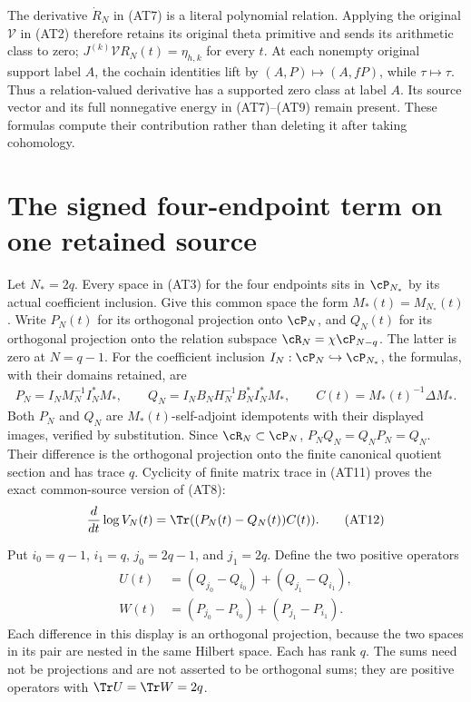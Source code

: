 \documentclass[10pt,a4paper,oneside]{report}
\begin{document}
The derivative $\dot R_N$ in (AT7) is a literal polynomial relation.
Applying the original $\mathcal V$ in (AT2) therefore retains its
original theta primitive and sends its arithmetic class to zero;
$J^{(k)}\mathcal V R_N(t)=\eta_{h,k}$ for every $t$.
At each nonempty original support label $A$, the cochain identities
lift by $(A,P)\mapsto(A,fP)$, while $\tau\mapsto\tau$.
Thus a relation-valued derivative has a supported zero class at
label $A$. Its source vector and its full nonnegative energy in
(AT7)--(AT9) remain present. These formulas compute their
contribution rather than deleting it after taking cohomology.

\section{The signed four-endpoint term on one retained source}

Let $N_*=2q$. Every space in (AT3) for the four endpoints sits in
$\cP_{N_*}$ by its actual coefficient inclusion. Give this common
space the form $M_*(t)=M_{N_*}(t)$. Write $P_N(t)$ for its
orthogonal projection onto $\cP_N$, and $Q_N(t)$ for its
orthogonal projection onto the relation subspace
$\cR_N=\chi\cP_{N-q}$. The latter is zero at $N=q-1$.
For the coefficient inclusion $I_N:\cP_N\hookrightarrow\cP_{N_*}$,
the formulas, with their domains retained, are
\[
 \begin{gathered}
 P_N=I_NM_N^{-1}I_N^*M_*,\qquad
 Q_N=I_NB_NH_N^{-1}B_N^*I_N^*M_*,\qquad
 C(t)=M_*(t)^{-1}\Delta M_*.                   \tag{AT11}
 \end{gathered}
\]
Both $P_N$ and $Q_N$ are $M_*(t)$-self-adjoint idempotents with
their displayed images, verified by substitution. Since
$\cR_N\subset\cP_N$, $P_NQ_N=Q_NP_N=Q_N$. Their difference is
the orthogonal projection onto the finite canonical quotient
section and has trace $q$. Cyclicity of finite matrix trace in
(AT11) proves the exact common-source version of (AT8):
\[
 \frac{d}{dt}\log V_N(t)=\Tr((P_N(t)-Q_N(t))C(t)).
                                                        \tag{AT12}
\]

Put $i_0=q-1$, $i_1=q$, $j_0=2q-1$, and $j_1=2q$.
Define the two positive operators
\[
 \begin{split}
 U(t)&=(Q_{j_0}-Q_{i_0})+(Q_{j_1}-Q_{i_1}),\\
 W(t)&=(P_{j_0}-P_{i_0})+(P_{j_1}-P_{i_1}).    
 \end{split}\tag{AT13}
\]
Each difference in this display is an orthogonal projection,
because the two spaces in its pair are nested in the same
Hilbert space. Each has rank $q$. The sums need not be
projections and are not asserted to be orthogonal sums; they
are positive operators with $\Tr U=\Tr W=2q$.
\end{document}
